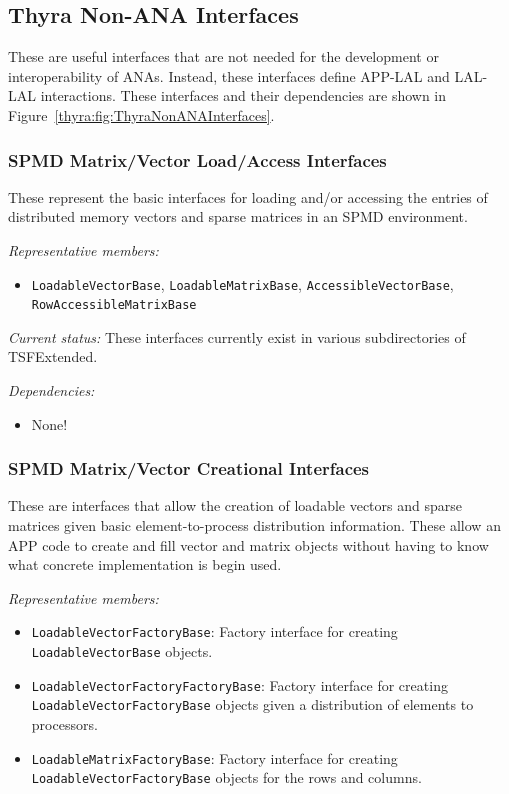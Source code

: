 \documentclass[pdf,ps2pdf,11pt]{SANDreport}
\begin{document}
%
\subsection{Thyra Non-ANA Interfaces}
%

These are useful interfaces that are not needed for the development or
interoperability of ANAs.  Instead, these interfaces define APP-LAL and
LAL-LAL interactions.  These interfaces and their dependencies are shown in
Figure~\ref{thyra:fig:ThyraNonANAInterfaces}.

%
\subsubsection{SPMD Matrix/Vector Load/Access Interfaces}
%

These represent the basic interfaces for loading and/or accessing the entries
of distributed memory vectors and sparse matrices in an SPMD environment.

{}\textit{Representative members:}
\begin{itemize}
%
{}\item {}\texttt{LoadableVectorBase}, {}\texttt{LoadableMatrixBase},
{}\texttt{AccessibleVectorBase}, {}\texttt{RowAccessibleMatrixBase}
%
\end{itemize}

{}\textit{Current status:} These interfaces currently exist in various
subdirectories of TSFExtended.

{}\textit{Dependencies:}
\begin{itemize}
\item None!
\end{itemize}

%
\subsubsection{SPMD Matrix/Vector Creational Interfaces}
%

These are interfaces that allow the creation of loadable vectors and sparse
matrices given basic element-to-process distribution information.  These allow
an APP code to create and fill vector and matrix objects without having to
know what concrete implementation is begin used.

{}\textit{Representative members:}
\begin{itemize}
%
{}\item {}\texttt{LoadableVectorFactoryBase}: Factory interface for creating
{}\texttt{LoadableVectorBase} objects.
%
{}\item {}\texttt{LoadableVectorFactoryFactoryBase}: Factory interface for
creating {}\texttt{LoadableVectorFactoryBase} objects given a distribution of
elements to processors.
%
{}\item {}\texttt{LoadableMatrixFactoryBase}: Factory interface for creating
{}\texttt{LoadableVectorFactoryBase} objects for the rows and columns.
%
\end{itemize}
\end{document}
